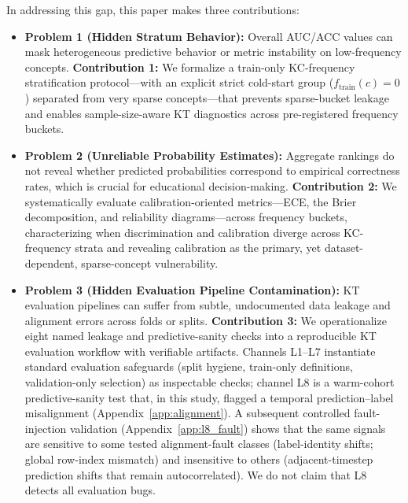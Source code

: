 In addressing this gap, this paper makes three contributions:
\begin{itemize}
    \item \textbf{Problem 1 (Hidden Stratum Behavior):} Overall AUC/ACC values can mask heterogeneous predictive behavior or metric instability on low-frequency concepts. 
    \textbf{Contribution 1:} We formalize a train-only KC-frequency stratification protocol---with an explicit strict cold-start group ($f_{\mathrm{train}}(c) = 0$) separated from very sparse concepts---that prevents sparse-bucket leakage and enables sample-size-aware KT diagnostics across pre-registered frequency buckets.
    \item \textbf{Problem 2 (Unreliable Probability Estimates):} Aggregate rankings do not reveal whether predicted probabilities correspond to empirical correctness rates, which is crucial for educational decision-making. 
    \textbf{Contribution 2:} We systematically evaluate calibration-oriented metrics---ECE, the Brier decomposition, and reliability diagrams---across frequency buckets, characterizing when discrimination and calibration diverge across KC-frequency strata and revealing calibration as the primary, yet dataset-dependent, sparse-concept vulnerability.
    \item \textbf{Problem 3 (Hidden Evaluation Pipeline Contamination):} KT evaluation pipelines can suffer from subtle, undocumented data leakage and alignment errors across folds or splits. 
    \textbf{Contribution 3:} We operationalize eight named leakage and predictive-sanity checks into a reproducible KT evaluation workflow with verifiable artifacts. Channels L1--L7 instantiate standard evaluation safeguards (split hygiene, train-only definitions, validation-only selection) as inspectable checks; channel L8 is a warm-cohort predictive-sanity test that, in this study, flagged a temporal prediction--label misalignment (Appendix~\ref{app:alignment}). A subsequent controlled fault-injection validation (Appendix~\ref{app:l8_fault}) shows that the same signals are sensitive to some tested alignment-fault classes (label-identity shifts; global row-index mismatch) and insensitive to others (adjacent-timestep prediction shifts that remain autocorrelated). We do not claim that L8 detects all evaluation bugs.
\end{itemize}

